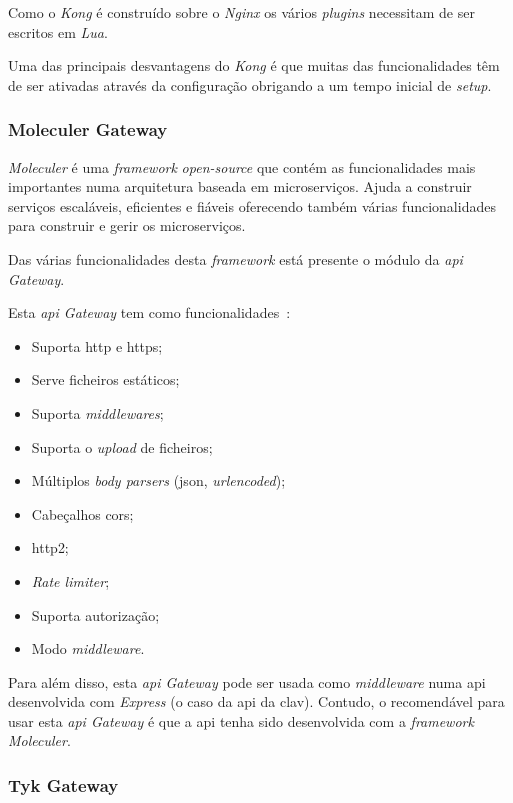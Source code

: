 Como o \textit{Kong} é construído sobre o \textit{Nginx} os vários \textit{plugins} necessitam de ser escritos em \textit{Lua}.

Uma das principais desvantagens do \textit{Kong} é que muitas das funcionalidades têm de ser ativadas através da configuração obrigando a um tempo inicial de \textit{setup}.

\subsubsection{Moleculer  Gateway}

\textit{Moleculer} é uma \textit{framework} \textit{open-source} que contém as funcionalidades mais importantes numa arquitetura baseada em microserviços. Ajuda a construir serviços escaláveis, eficientes e fiáveis oferecendo também várias funcionalidades para construir e gerir os microserviços.

Das várias funcionalidades desta \textit{framework} está presente o módulo da \textit{\acrshort{api} Gateway}.

Esta \textit{\acrshort{api} Gateway} tem como funcionalidades~\cite{moleculerAPIG}:
\begin{itemize}
    \item Suporta \acrshort{http} e \acrshort{https};
    \item Serve ficheiros estáticos;
    \item Suporta \textit{middlewares};
    \item Suporta o \textit{upload} de ficheiros;
    \item Múltiplos \textit{body parsers} (\acrshort{json}, \textit{urlencoded});
    \item Cabeçalhos \acrshort{cors};
    \item \acrshort{http}2;
    \item \textit{Rate limiter};
    \item Suporta autorização;
    \item Modo \textit{middleware}.
\end{itemize}

Para além disso, esta \textit{\acrshort{api} Gateway} pode ser usada como \textit{middleware} numa \acrshort{api} desenvolvida com \textit{Express} (o caso da \acrshort{api} da \acrshort{clav}). Contudo, o recomendável para usar esta \textit{\acrshort{api} Gateway} é que a \acrshort{api} tenha sido desenvolvida com a \textit{framework} \textit{Moleculer}.

\subsubsection{Tyk  Gateway}

